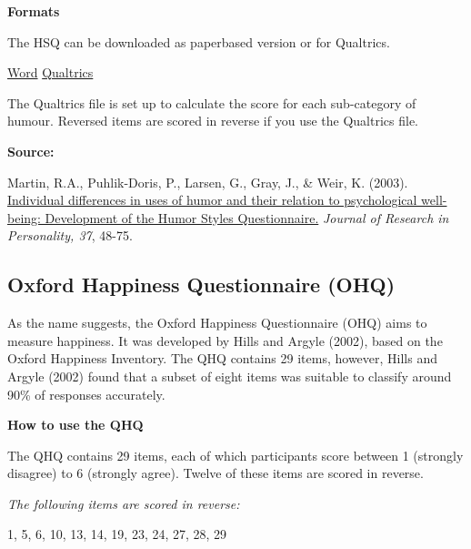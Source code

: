 \documentclass[
]{book}
\begin{document}
\textbf{Formats}

The HSQ can be downloaded as paperbased version or for Qualtrics.

\href{questionnaires/HumorStylesQuestionnaire.docx}{Word} \textbar{} \href{questionnaires/HumorStylesQuestionnaire.qsf}{Qualtrics}

The Qualtrics file is set up to calculate the score for each sub-category of humour. Reversed items are scored in reverse if you use the Qualtrics file.

\textbf{Source:}

Martin, R.A., Puhlik-Doris, P., Larsen, G., Gray, J., \& Weir, K. (2003). \href{https://d1wqtxts1xzle7.cloudfront.net/56892479/HSQ_article.pdf?1530281324=\&response-content-disposition=inline\%3B+filename\%3DIndividual_differences_in_uses_of_humor.pdf\&Expires=1598969255\&Signature=c2oQ1bWDYeWlwZslWOqrGvNdgjeYek-qW6UbPTZVWozQfdWJ8HAKPZHZRSACz1mNY6TYSVsbQgCYsC~1vG7IWPHEnUyQtT2cWsljBOMDj-m6KECtv9OSsQqBWQqTbOQbaGbyRGaCJbbdYEPr4uNZM8zVWZWB0cQU105xtYzzrqyrEQvnR-8x7Y2-7pCwPBMptT8CLRgiv4~WEz1auOoHClqgZ0pAg6Qe8oTVIYFaX40f0gT2At1JKH-xmb1-IHX7wWz9zux-3WMYZ0~jNi4kruIbEHnSS6HrAmF-sin3lWpItwnvWRJ2XbJEFvaU3HqsWTdmsM2WpnIwBQ8I5mCKpw__\&Key-Pair-Id=APKAJLOHF5GGSLRBV4ZA}{Individual differences in uses of humor and their relation to psychological well-being: Development of the Humor Styles Questionnaire.} \emph{Journal of Research in Personality, 37}, 48-75.

\hypertarget{oxford-happiness-questionnaire-ohq}{%
\subsection{Oxford Happiness Questionnaire (OHQ)}\label{oxford-happiness-questionnaire-ohq}}

As the name suggests, the Oxford Happiness Questionnaire (OHQ) aims to measure happiness. It was developed by Hills and Argyle (2002), based on the Oxford Happiness Inventory. The QHQ contains 29 items, however, Hills and Argyle (2002) found that a subset of eight items was suitable to classify around 90\% of responses accurately.

\textbf{How to use the QHQ}

The QHQ contains 29 items, each of which participants score between 1 (strongly disagree) to 6 (strongly agree). Twelve of these items are scored in reverse.

\emph{The following items are scored in reverse:}

1, 5, 6, 10, 13, 14, 19, 23, 24, 27, 28, 29
\end{document}
